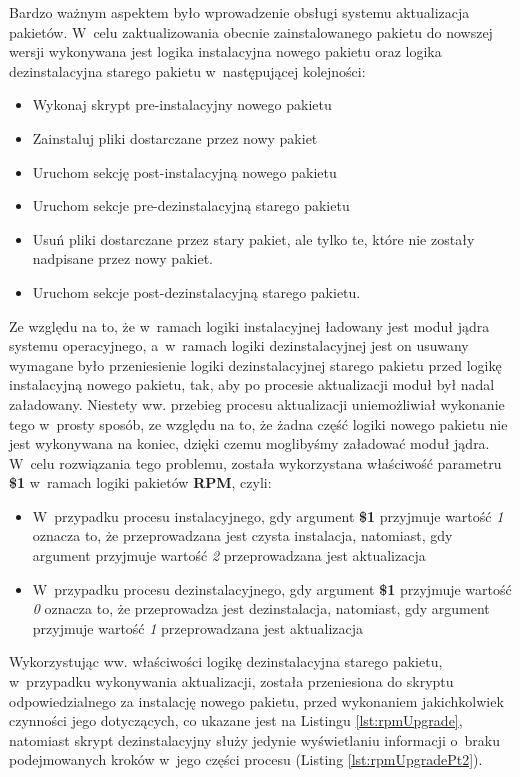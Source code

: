 Bardzo ważnym aspektem było wprowadzenie obsługi systemu aktualizacja pakietów. W~celu zaktualizowania obecnie zainstalowanego pakietu do nowszej wersji wykonywana jest logika instalacyjna nowego pakietu oraz logika dezinstalacyjna starego pakietu w~następującej kolejności:
\begin{itemize}
\item Wykonaj skrypt pre-instalacyjny nowego pakietu
\item Zainstaluj pliki dostarczane przez nowy pakiet
\item Uruchom sekcję post-instalacyjną nowego pakietu
\item Uruchom sekcje pre-dezinstalacyjną starego pakietu
\item Usuń pliki dostarczane przez stary pakiet, ale tylko te, które nie zostały nadpisane przez nowy pakiet.
\item Uruchom sekcje post-dezinstalacyjną starego pakietu. \cite{RPMUpgrade}
\end{itemize}


Ze względu na to, że w~ramach logiki instalacyjnej ładowany jest moduł jądra systemu operacyjnego, a~w~ramach logiki dezinstalacyjnej jest on usuwany wymagane było przeniesienie logiki dezinstalacyjnej starego pakietu przed logikę instalacyjną nowego pakietu, tak, aby po procesie aktualizacji moduł był nadal załadowany. Niestety ww. przebieg procesu aktualizacji uniemożliwiał wykonanie tego w~prosty sposób, ze względu na to, że żadna część logiki nowego pakietu nie jest wykonywana na koniec, dzięki czemu moglibyśmy załadować moduł jądra. W~celu rozwiązania tego problemu, została wykorzystana właściwość parametru \textbf{\$1} w~ramach logiki pakietów \textbf{RPM}, czyli:
\begin{itemize}
\item W~przypadku procesu instalacyjnego, gdy argument \textbf{\$1} przyjmuje wartość \textit{1} oznacza to, że przeprowadzana jest czysta instalacja, natomiast, gdy argument przyjmuje wartość \textit{2} przeprowadzana jest aktualizacja
\item W~przypadku procesu dezinstalacyjnego, gdy argument \textbf{\$1} przyjmuje wartość \textit{0} oznacza to, że przeprowadza jest dezinstalacja, natomiast, gdy argument przyjmuje wartość \textit{1} przeprowadzana jest aktualizacja
\end{itemize}

Wykorzystując ww. właściwości logikę dezinstalacyjna starego pakietu, w~przypadku wykonywania aktualizacji, została przeniesiona do skryptu odpowiedzialnego za instalację nowego pakietu, przed wykonaniem jakichkolwiek czynności jego dotyczących, co ukazane jest na Listingu \ref{lst:rpmUpgrade}, natomiast skrypt dezinstalacyjny służy jedynie wyświetlaniu informacji o~braku podejmowanych kroków w~jego części procesu (Listing \ref{lst:rpmUpgradePt2}).

